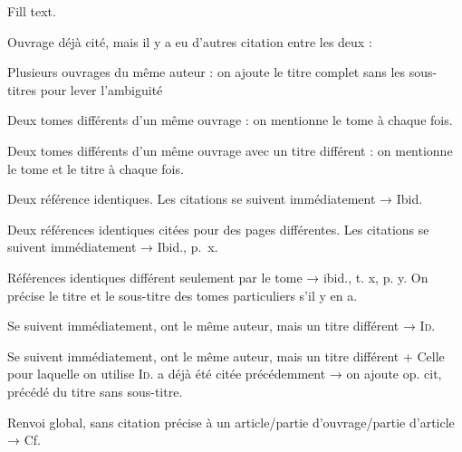 Fill text.\autocite{unarticle}

\newpage
Ouvrage déjà cité, mais il y a eu d'autres citation entre les deux :
\autocite[15]{poucet}\autocite{test}\autocite[31]{poucet}

\newpage
Plusieurs ouvrages du même auteur : on ajoute le titre complet sans les sous-titres pour lever l'ambiguité
\autocite[146]{genettemim}\autocite{test}\autocite[16--29]{genettefig}\autocite{test}\autocite[103]{genettemim}

\newpage
Deux tomes différents d'un même ouvrage : on mentionne le tome à chaque fois.
\autocite[103]{martin1}\autocite{test}\autocite[71]{martin2}

\newpage
Deux tomes différents d'un même ouvrage avec un titre différent : on mentionne le tome et le titre à chaque fois.
\autocite[115]{remond1}\autocite{test}\autocite{remond2}

\newpage
Deux référence identiques. Les citations se suivent immédiatement → Ibid.
\autocite[41--57]{leclerc}\autocite[41--57]{leclerc}

\newpage
Deux références identiques citées pour des pages différentes. Les citations se suivent immédiatement → Ibid., p.~x.
\autocite[105]{vouilloux}\autocite[80]{vouilloux}

\newpage
Références identiques différent seulement par le tome → ibid., t. x, p. y. %
On précise le titre et le sous-titre des tomes particuliers s'il y en a.
\autocite[115]{remondx1}\autocite[45]{remondx2}

\newpage
Se suivent immédiatement, ont le même auteur, mais un titre différent → \textsc{Id.}
\autocite[197]{genettexmim}\autocite[91]{genettexfig}

\newpage
Se suivent immédiatement, ont le même auteur, mais un titre différent + Celle pour laquelle on utilise \textsc{Id.} a déjà été citée précédemment → on ajoute op. cit, précédé du titre sans sous-titre.
\autocite[79--93]{genetteyfig}\autocite[146]{genetteymim}\autocite[103]{genetteyfig}

\newpage
Renvoi global, sans citation précise à un article/partie d'ouvrage/partie d'article → Cf.
\autocite[Cf.][]{delatte}




\newpage





\printbibliography[title={Bibliographie}]













